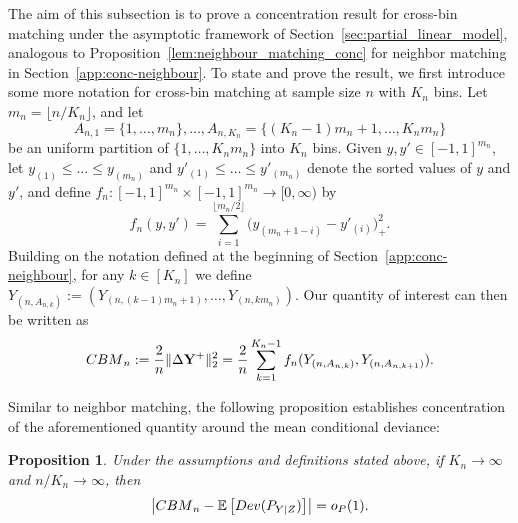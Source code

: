 \documentclass[12pt]{article}
\newtheorem{proposition}[theorem]{Proposition}
\newcommand{\EE}[1]{\mathbb{E}\left[{#1}\right]}
\newcommand{\bY}{\mathbf{Y}}
\begin{document}
The aim of this subsection is to prove a concentration result for cross-bin matching under the asymptotic framework of Section~\ref{sec:partial_linear_model}, analogous to Proposition~\ref{lem:neighbour_matching_conc} for neighbor matching in Section~\ref{app:conc-neighbour}. To state and prove the result, we first introduce some more notation for cross-bin matching at sample size $n$ with $K_n$ bins. Let $m_n=\lfloor n/K_n\rfloor$, and let
\[
A_{n,1} = \big\{1,\dots,m_n\big\}, \dots, A_{n,K_n} = \big\{(K_n-1)m_n+ 1, \dots, K_nm_n\big\}
\]
be an uniform partition of $\{1,\ldots,K_nm_n\}$ into $K_n$ bins.  Given $y,y'\in[-1,1]^{m_n}$, let $y_{(1)}\leq \dots \leq y_{(m_n)}$ and $y'_{(1)}\leq \dots \leq y'_{(m_n)}$ denote the sorted values of $y$ and $y'$, and define $f_n: [-1,1]^{m_n}\times [-1,1]^{m_n} \to [0,\infty)$ by
\begin{equation}
\label{Eq:fn}
f_n(y,y') = \sum_{i=1}^{\lfloor m_n/2\rfloor}\big(y_{(m_n+1-i)} - y'_{(i)}\big)^2_+.
\end{equation}
Building on the notation defined at the beginning of Section~\ref{app:conc-neighbour}, for any $k\in [K_n]$ we define 
$Y_{(n,A_{n,k})}:=(Y_{(n,(k-1)m_n+1)},\ldots, Y_{(n,km_n)})$.
Our quantity of interest can then be written as
\[
{\rm CBM}_n := \frac{2}{n}\|\Delta\bY^+\|^2_2 = \frac{2}{n}\sum_{k=1}^{K_n-1} f_n(Y_{(n,A_{n,k})},Y_{(n,A_{n,k+1})}).
\]

Similar to neighbor matching, the following proposition establishes concentration of the aforementioned quantity around the mean conditional deviance:
\begin{proposition}\label{lem:cross_bin_lemma}
Under the assumptions and definitions stated above, if $K_n\to\infty$ and $n/K_n\to\infty$, then
\[\left|{\rm CBM}_n - \EE{\textnormal{Dev}(P_{Y|Z})}\right| = {\rm o}_P(1).\]
\end{proposition}
\end{document}
